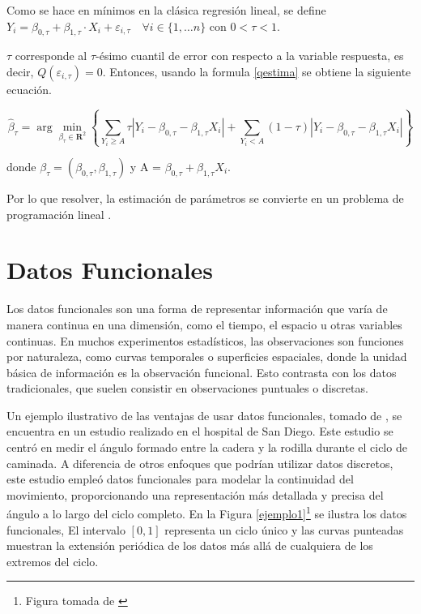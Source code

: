 
\begin{obs}
    Como se hace en mínimos en la clásica regresión lineal, se define $Y_i=\beta_{0, \tau}+\beta_{1, \tau} \cdot X_i+\varepsilon_{i, \tau} \quad \forall i \in\{1, \dots n\}$ con $0 < \tau < 1$.
    
    $\tau$ corresponde al $\tau$-ésimo cuantil de error con respecto a la variable respuesta, es decir, $Q(\varepsilon_{i, \tau}) = 0$. Entonces, usando la formula \eqref{qestima} se obtiene la siguiente ecuación.

    \begin{equation}
        \hat{\beta}_\tau=\arg \min _{\beta_\tau \in \mathbf{R}^2}\left\{\sum_{Y_i \geq A} \tau \left|Y_i-\beta_{0, \tau}-\beta_{1, \tau} X_i\right|+\sum_{Y_i<A}(1-\tau) \left|Y_i-\beta_{0, \tau}-\beta_{1, \tau}  X_i\right|\right\}
    \end{equation}

    donde $\beta_\tau = (\beta_{0, \tau}, \beta_{1, \tau} )$ y A = $\beta_{0, \tau} + \beta_{1, \tau}X_i $.

    Por lo que resolver, la estimación de parámetros se convierte en un problema de programación lineal \cite{RegLinealCuantil}.
\end{obs}


\section{Datos Funcionales}

Los datos funcionales son una forma de representar información que varía de manera continua en una dimensión, como el tiempo, el espacio u otras variables continuas. En muchos experimentos estadísticos, las observaciones son funciones por naturaleza, como curvas temporales o superficies espaciales, donde la unidad básica de información es la observación funcional. Esto contrasta con los datos tradicionales, que suelen consistir en observaciones puntuales o discretas.

Un ejemplo ilustrativo de las ventajas de usar datos funcionales, tomado de \cite[Pág. 6]{Ramsay2009}, se encuentra en un estudio realizado en el hospital de San Diego. Este estudio se centró en medir el ángulo formado entre la cadera y la rodilla durante el ciclo de caminada. A diferencia de otros enfoques que podrían utilizar datos discretos, este estudio empleó datos funcionales para modelar la continuidad del movimiento, proporcionando una representación más detallada y precisa del ángulo a lo largo del ciclo completo. En la Figura \ref{ejemplo1}\footnote{Figura tomada de \cite{Ramsay2009}} se ilustra los datos funcionales, El intervalo $[0,1]$ representa un ciclo único y las curvas punteadas muestran la extensión periódica de los datos más allá de cualquiera de los extremos del ciclo.

